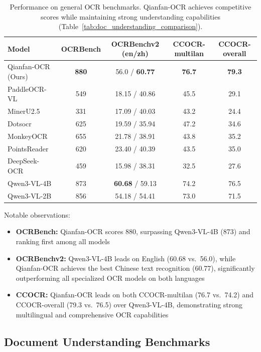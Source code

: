 \documentclass[dvipsnames]{article}
\begin{document}
\begin{table}[H]
\centering
\small
\setlength{\tabcolsep}{6pt}
\begin{tabular}{l|cccc}
\toprule
\textbf{Model} & \textbf{OCRBench} & \textbf{OCRBenchv2 (en/zh)} & \textbf{CCOCR-multilan} & \textbf{CCOCR-overall} \\
\midrule
Qianfan-OCR (Ours) & \textbf{880} & 56.0 / \textbf{60.77} & \textbf{76.7} & \textbf{79.3} \\
PaddleOCR-VL & 549 & 18.15 / 40.86 & 45.5 & 29.1 \\
MinerU2.5 & 331 & 17.09 / 40.03 & 43.2 & 24.4 \\
Dotsocr & 625 & 19.59 / 35.94 & 47.2 & 34.6 \\
MonkeyOCR & 655 & 21.78 / 38.91 & 43.8 & 35.2 \\
PointsReader & 620 & 23.40 / 40.39 & 43.5 & 35.0 \\
DeepSeek-OCR & 459 & 15.98 / 38.31 & 32.5 & 27.6 \\
Qwen3-VL-4B & 873 & \textbf{60.68} / 59.13 & 74.2 & 76.5 \\
Qwen3-VL-2B & 856 & 54.18 / 54.41 & 73.0 & 71.5 \\
\bottomrule
\end{tabular}
\caption{Performance on general OCR benchmarks. Qianfan-OCR achieves competitive scores while maintaining strong understanding capabilities (Table~\ref{tab:doc_understanding_comparison}).}
\label{tab:general_ocr}
\end{table}

Notable observations:
\begin{itemize}[noitemsep,topsep=0pt]
\item \textbf{OCRBench:} Qianfan-OCR scores 880, surpassing Qwen3-VL-4B (873) and ranking first among all models
\item \textbf{OCRBenchv2:} Qwen3-VL-4B leads on English (60.68 vs.\ 56.0), while Qianfan-OCR achieves the best Chinese text recognition (60.77), significantly outperforming all specialized OCR models on both languages
\item \textbf{CCOCR:} Qianfan-OCR leads on both CCOCR-multilan (76.7 vs.\ 74.2) and CCOCR-overall (79.3 vs.\ 76.5) over Qwen3-VL-4B, demonstrating strong multilingual and comprehensive OCR capabilities
\end{itemize}

\subsection{Document Understanding Benchmarks}
\end{document}
